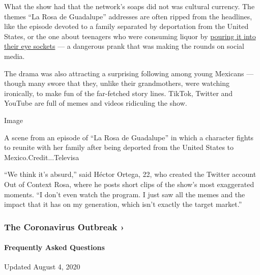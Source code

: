 What the show had that the network's soaps did not was cultural
currency. The themes ``La Rosa de Guadalupe'' addresses are often ripped
from the headlines, like the episode devoted to a family separated by
deportation from the United States, or the one about teenagers who were
consuming liquor by
\href{https://www.ncbi.nlm.nih.gov/pmc/articles/PMC4009175/}{pouring it
into their eye sockets} --- a dangerous prank that was making the rounds
on social media.

The drama was also attracting a surprising following among young
Mexicans --- though many swore that they, unlike their grandmothers,
were watching ironically, to make fun of the far-fetched story lines.
TikTok, Twitter and YouTube are full of memes and videos ridiculing the
show.

Image

A scene from an episode of ``La Rosa de Guadalupe'' in which a character
fights to reunite with her family after being deported from the United
States to Mexico.Credit...Televisa

``We think it's absurd,'' said Héctor Ortega, 22, who created the
Twitter account Out of Context Rosa, where he posts short clips of the
show's most exaggerated moments. ``I don't even watch the program. I
just saw all the memes and the impact that it has on my generation,
which isn't exactly the target market.''

\href{https://www.nytimes.com/news-event/coronavirus?action=click\&pgtype=Article\&state=default\&region=MAIN_CONTENT_3\&context=storylines_faq}{}

\hypertarget{the-coronavirus-outbreak-}{%
\subsubsection{The Coronavirus Outbreak
›}\label{the-coronavirus-outbreak-}}

\hypertarget{frequently-asked-questions}{%
\paragraph{Frequently Asked
Questions}\label{frequently-asked-questions}}

Updated August 4, 2020

